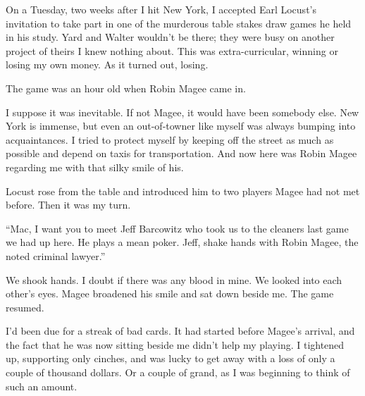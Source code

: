 \documentclass{novel}
\begin{document}
\vspace{2\nbs}
\clearpage
\thispagestyle{empty}
\begin{ChapterStart}
\vspace{3\nbs}
\end{ChapterStart}

On a Tuesday, two weeks after I hit New York, I accepted Earl Locust’s invitation to take part in one of the murderous table stakes draw games he held in his study. Yard and Walter wouldn’t be there; they were busy on another project of theirs I knew nothing about. This was extra-curricular, winning or losing my own money. As it turned out, losing.

The game was an hour old when Robin Magee came in.

I suppose it was inevitable. If not Magee, it would have been somebody else. New York is immense, but even an out-of-towner like myself was always bumping into acquaintances. I tried to protect myself by keeping off the street as much as possible and depend on taxis for transportation. And now here was Robin Magee regarding me with that silky smile of his.

Locust rose from the table and introduced him to two players Magee had not met before. Then it was my turn. 

“Mac, I want you to meet Jeff Barcowitz who took us to the cleaners last game we had up here. He plays a mean poker. Jeff, shake hands with Robin Magee, the noted criminal lawyer.”

We shook hands. I doubt if there was any blood in mine. We looked into each other’s eyes. Magee broadened his smile and sat down beside me. The game resumed.

I’d been due for a streak of bad cards. It had started before Magee’s arrival, and the fact that he was now sitting beside me didn’t help my playing. I tightened up, supporting only cinches, and was lucky to get away with a loss of only a couple of thousand dollars. Or a couple of grand, as I was beginning to think of such an amount.
\end{document}
